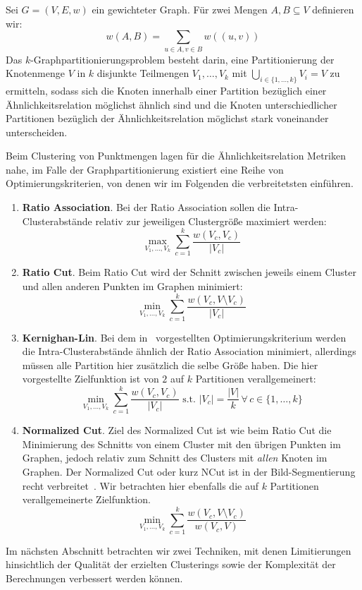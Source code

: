 \begin{definition}[$k$-Graphpartitionierung]
	Sei $G=(V,E,w)$ ein gewichteter Graph. Für zwei Mengen $A, B \subseteq V$ definieren wir:
	\[ w(A,B) = \sum_{u \in A, v \in B} w((u,v)) \]
	Das $k$-Graphpartitionierungsproblem besteht darin, eine Partitionierung der Knotenmenge $V$ in $k$ disjunkte Teilmengen
	$V_1, \dots, V_k$ mit $\bigcup_{i \in \{1, \dots, k \}} V_i = V$ zu ermitteln, sodass sich die Knoten innerhalb einer
	Partition bezüglich einer Ähnlichkeitsrelation möglichst ähnlich sind und die Knoten unterschiedlicher Partitionen
	bezüglich der Ähnlichkeitsrelation möglichst stark voneinander unterscheiden.
	
	Beim Clustering von Punktmengen lagen für die Ähnlichkeitsrelation Metriken nahe, im Falle der Graphpartitionierung
	existiert eine Reihe von Optimierungskriterien, von denen wir im Folgenden die verbreitetsten einführen.
	
	\begin{enumerate}
		\item 	\textbf{Ratio Association}. Bei der Ratio Association sollen die Intra-Clusterabstände relativ zur jeweiligen
				Clustergröße maximiert werden:
				\[ \max_{V_1, \dots, V_k} \sum_{c=1}^{k} \frac{w(V_c, V_c)}{\left|V_c\right|} \]
		\item 	\textbf{Ratio Cut}. Beim Ratio Cut wird der Schnitt zwischen jeweils einem Cluster und allen anderen Punkten
				im Graphen minimiert:
				\[ \min_{V_1, \dots, V_k} \sum_{c=1}^{k} \frac{w(V_c, V \setminus V_c)}{\left|V_c\right|} \]
		\item 	\textbf{Kernighan-Lin}. Bei dem in~\cite{KernighanL70} vorgestellten Optimierungskriterium werden die
				Intra-Clusterabstände ähnlich der Ratio Association minimiert, allerdings müssen alle Partition hier zusätzlich
				die selbe Größe haben. Die hier vorgestellte Zielfunktion ist von $2$ auf $k$ Partitionen verallgemeinert:
				\[ \min_{V_1, \dots, V_k} \sum_{c=1}^{k} \frac{w(V_c, V_c)}{\left|V_c\right|} \textrm{ s.t. } 
				   \left|V_c\right| = \frac{\left|V\right|}{k} \, \forall \, c \in \{ 1, \dots, k \} \]
		\item 	\textbf{Normalized Cut}. Ziel des Normalized Cut ist wie beim Ratio Cut die Minimierung des Schnitts von einem
				Cluster mit den übrigen Punkten im Graphen, jedoch relativ zum Schnitt des Clusters mit \emph{allen}
				Knoten im Graphen. Der Normalized Cut oder kurz NCut ist in der Bild-Segmentierung recht verbreitet~\cite{ShiM00}.
				Wir betrachten hier ebenfalls die auf $k$ Partitionen verallgemeinerte Zielfunktion.
				\[ \min_{V_1, \dots, V_k} \sum_{c=1}^{k} \frac{w(V_c, V \setminus V_c)}{w(V_c, V)} \]
	\end{enumerate}
\end{definition}
Im nächsten Abschnitt betrachten wir zwei Techniken, mit denen Limitierungen hinsichtlich der Qualität der erzielten Clusterings
sowie der Komplexität der Berechnungen verbessert werden können.

